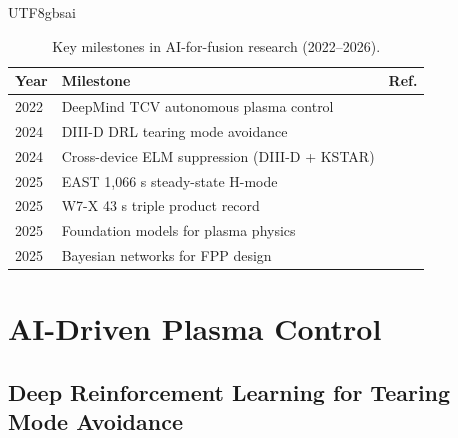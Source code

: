 \documentclass[12pt,a4paper]{article}
\begin{document}
\begin{CJK}{UTF8}{gbsai}
\begin{table}[htbp]
\centering
\caption{Key milestones in AI-for-fusion research (2022--2026).}
\label{fig:timeline}
\begin{tabular}{lll}
\toprule
Year & Milestone & Ref. \\
\midrule
2022 & DeepMind TCV autonomous plasma control & \citep{Degrave2022Nature} \\
2024 & DIII-D DRL tearing mode avoidance & \citep{Seo2024Nature} \\
2024 & Cross-device ELM suppression (DIII-D + KSTAR) & \citep{Kim2024APSDPP} \\
2025 & EAST 1,066 s steady-state H-mode & \citep{Wan2025EAST} \\
2025 & W7-X 43 s triple product record & \citep{Klinger2025W7X} \\
2025 & Foundation models for plasma physics & \citep{Zhu2025} \\
2025 & Bayesian networks for FPP design & \citep{Griffiths2025} \\
\bottomrule
\end{tabular}
\end{table}

\section{AI-Driven Plasma Control}

\subsection{Deep Reinforcement Learning for Tearing Mode Avoidance}


\end{CJK}
\end{document}
